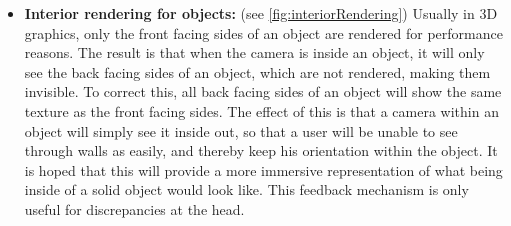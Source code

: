 \begin{itemize}
    \item \textbf{Interior rendering for objects:} (see \autoref{fig:interiorRendering})
    \newline
    Usually in 3D graphics, only the front facing sides of an object are rendered for performance reasons. The result is that when the camera is inside an object, it will only see the back facing sides of an object, which are not rendered, making them invisible. To correct this, all back facing sides of an object will show the same texture as the front facing sides. The effect of this is that a camera within an object will simply see it inside out, so that a user will be unable to see through walls as easily, and thereby keep his orientation within the object. It is hoped that this will provide a more immersive representation of what being inside of a solid object would look like.
    \newline
    This feedback mechanism is only useful for discrepancies at the head.
    

\end{itemize}
